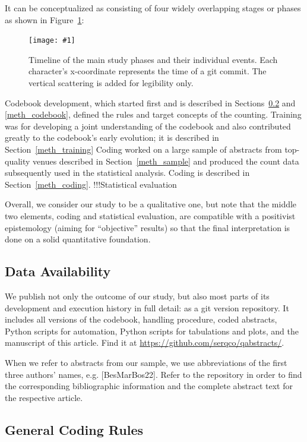 \documentclass[10pt,journal,compsoc]{IEEEtran}
\newcommand{\Plot}[2]{%
	\begin{figure}[htb]%
		\centering\texttt{[image: \#1]}%
		\vspace{-4mm}\caption{#2}\label{#1}%
	\end{figure}}
\begin{document}
It can be conceptualized as consisting of four widely overlapping stages or phases
as shown in Figure~\ref{qabstracts_timeline_commits}:
%
\Plot{qabstracts_timeline_commits}{%
	Timeline of the main study phases and their individual events.
    Each character's x-coordinate represents the time of a git commit.
    The vertical scattering is added for legibility only.}
%
Codebook development, which started first and is described in Sections~\ref{meth_codingrules}
and \ref{meth_codebook},
defined the rules and target concepts of the counting.
Training was for developing a joint understanding of the codebook and also contributed
greatly to the codebook's early evolution;
it is described in Section~\ref{meth_training}
Coding worked on a large sample of abstracts from top-quality venues described in
Section~\ref{meth_sample} and produced the count data subsequently used in the statistical analysis.
Coding is described in Section~\ref{meth_coding}.
!!!Statistical evaluation

Overall, we consider our study to be a qualitative one, but note that the middle two elements,
coding and statistical evaluation,
are compatible with a positivist epistemology (aiming for ``objective'' results) so that
the final interpretation is done on a solid quantitative foundation.


\subsection{Data Availability}\label{dataavailability}

We publish not only the outcome of our study, but also most parts of its development and
execution history in full detail: as a git version repository.
It includes all versions of the
codebook, handling procedure, coded abstracts, Python scripts for automation,
Python scripts for tabulations and plots, and the manuscript of this article.
Find it at \url{https://github.com/serqco/qabstracts/}.

When we refer to abstracts from our sample, we use abbreviations of the first three
authors' names, e.g. [BesMarBos22].
Refer to the repository in order to find the corresponding bibliographic information
and the complete abstract text for the respective article.


\subsection{General Coding Rules}\label{meth_codingrules}
\end{document}
